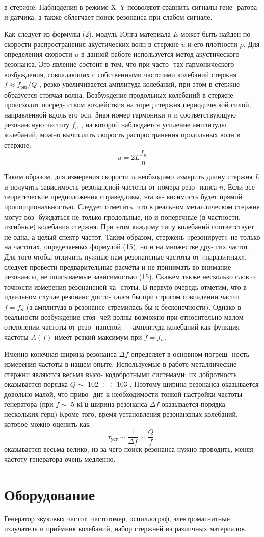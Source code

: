 \documentclass[a4, 12pt]{article}
\begin{document}
в стержне. Наблюдения в режиме X–Y позволяют сравнить сигналы гене-
ратора и датчика, а также облегчает поиск резонанса при слабом сигнале.
\par Как следует из формулы (2), модуль Юнга материала $E$ может быть
найден по скорости распространения акустических волн в стержне $u$ и его
плотности $\rho$. Для определения скорости $u$ в данной работе используется
метод акустического резонанса. Это явление состоит в том, что при часто-
тах гармонического возбуждения, совпадающих с собственными частотами
колебаний стержня $f \approx f_\text{рез}/Q$ , резко увеличивается амплитуда колебаний, при
этом в стержне образуется стоячая волна.
Возбуждение продольных колебаний в стержне происходит посред-
ством воздействия на торец стержня периодической силой, направленной
вдоль его оси. Зная номер гармоники $n$ и соответствующую резонансную
частоту $f_n$ , на которой наблюдается усиление амплитуды колебаний,
можно вычислить скорость распространения продольных волн в стержне:
\begin{equation}
    u = 2L\frac{f_n}{n}
\end{equation}

Таким образом, для измерения скорости $u$ необходимо измерить длину
стержня $L$ и получить зависимость резонансной частоты от номера резо-
нанса $n$. Если все теоретические предположения справедливы, эта за-
висимость будет прямой пропорциональностью.
Следует отметить, что в реальном металлическом стержне могут воз-
буждаться не только продольные, но и поперечные (в частности, изгибные)
колебания стержня. При этом каждому типу колебаний соответствует не
одна, а целый спектр частот. Таким образом, стержень «резонирует» не
только на частотах, определяемых формулой (15), но и на множестве дру-
гих частот. Для того чтобы отличить нужные нам резонансные частоты от
«паразитных», следует провести предварительные расчёты и не принимать
во внимание резонансы, не описываемые зависимостью (15).
Скажем также несколько слов о точности измерения резонансной ча-
стоты. В первую очередь отметим, что в идеальном случае резонанс дости-
гался бы при строгом совпадении частот $f = f_n$ (а амплитуда в резонансе
стремилась бы к бесконечности). Однако в реальности возбуждение стоя-
чей волны возможно при относительно малом отклонении частоты от резо-
нансной — амплитуда колебаний как функция частоты $A(f)$ имеет резкий
максимум при $f = f_n$.
\par Именно конечная ширина резонанса $\Delta f$ определяет в основном погреш-
ность измерения частоты в нашем опыте.
Используемые в работе металлические стержни являются весьма высо-
кодобротными системами: их добротность оказывается порядка $Q\sim$ 102 ÷
÷ 103 . Поэтому ширина резонанса оказывается довольно малой, что приво-
дит к необходимости тонкой настройки частоты генератора (при $f\sim$
 5 кГц ширина резонанса $\Delta f$ оказывается порядка нескольких герц)
Кроме того, время установления резонансных колебаний, которое можно
оценить как
\begin{equation}
    \tau_\text{уст} \sim \frac{1}{\Delta f} \sim \frac{Q}{f},
\end{equation}
оказывается весьма велико, из-за чего поиск резонанса нужно проводить, меняя частоту
генератора очень медленно.
\section{Оборудование}
Генератор звуковых частот, частотомер, осциллограф,
электромагнитные излучатель и приёмник колебаний, набор стержней из различных материалов.
\end{document}

